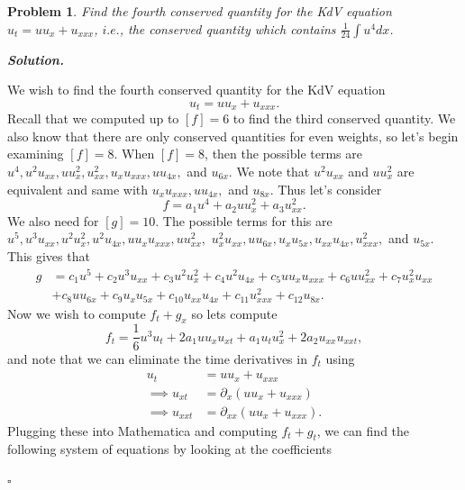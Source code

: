 \documentclass[12pt]{report}
\newtheorem{problem}{Problem}
\newenvironment{solution}[1][\it{Solution}]{\textbf{#1. } }{$\square$}
\begin{document}
\newpage



\begin{problem}
    Find the fourth conserved quantity for the KdV equation $u_t=u u_x+u_{xxx}$, $i.e.$, the conserved quantity which contains $\frac{1}{24} \int u^4 dx$.
\end{problem}

\begin{solution}

    \noindent
    We wish to find the fourth conserved quantity for the KdV equation
    \[ 
        u_t = uu_x + u_{xxx}.
    \] 
    Recall that we computed up to $[f]=6$ to find the third conserved quantity. We also know that there are only conserved quantities for even weights, so let's begin examining $[f]=8$. When $[f] = 8$, then the possible terms are $u^4,u^2u_{xx},uu_x^2,u_{xx}^2,u_xu_{xxx},uu_{4x},$ and $u_{6x}.$ We note that $u^2u_{xx}$ and $uu_{x}^2$ are equivalent and same with $u_xu_{xxx},uu_{4x},$ and $u_{8x}$. Thus let's consider
    \[
        f = a_1u^4 + a_2uu_x^2 + a_3u^2_{xx}.
    \] 
    We also need for $[g]=10$. The possible terms for this are $u^5,u^3u_{xx},u^2u_x^2,u^2u_{4x},uu_xu_{xxx},uu_{xx}^2,$ $u^2_xu_{xx}, uu_{6x},u_xu_{5x},u_{xx}u_{4x},u^2_{xxx},$ and $u_{5x}.$ This gives that
    \begin{align*}
        g&=c_1u^5 + c_2u^3u_{xx} + c_3u^2u_x^2 + c_4u^2u_{4x} + c_5uu_xu_{xxx} + c_6uu_{xx}^2 + c_7u_x^2u_{xx}\\ 
        &+ c_8uu_{6x} + c_9u_xu_{5x} + c_{10}u_{xx}u_{4x} + c_{11}u_{xxx}^2 + c_{12}u_{8x}.
    \end{align*} 
    Now we wish to compute $f_t + g_x$ so lets compute
    \[ 
        f_t = \frac{1}{6}u^3u_t + 2a_1uu_xu_{xt} + a_1u_tu_x^2 + 2a_2u_{xx}u_{xxt},
    \]
    and note that we can eliminate the time derivatives in $f_t$ using
    \begin{align*}
        u_t &= uu_x + u_{xxx}\\
        \implies u_{xt} &= \partial_x(uu_x + u_{xxx})\\
        \implies u_{xxt} &= \partial_{xx}(uu_x + u_{xxx}).
    \end{align*}
    Plugging these into Mathematica and computing $f_t + g_t$, we can find the following system of equations by looking at the coefficients 

\end{solution}
\end{document}
